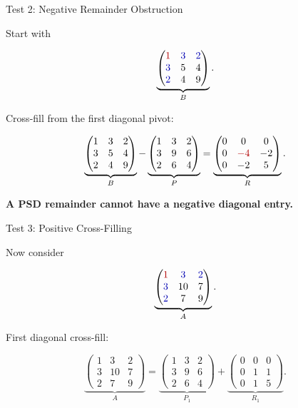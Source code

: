 \documentclass[10pt]{beamer}
\theoremstyle{definition}
\newcommand{\x}[1]{\alert{\textbf{#1}}}
\newcommand{\rd}[1]{{\color{red!70!black}#1}}
\newcommand{\bl}[1]{{\color{blue!70!black}#1}}
\begin{document}
\begin{frame}{Test 2: Negative Remainder Obstruction}

Start with

\[
\underbrace{
\begin{pmatrix}
\rd{1}&\bl{3}&\bl{2}\\
\bl{3}&5&4\\
\bl{2}&4&9
\end{pmatrix}}_{B}.
\]

\vfill

Cross-fill from the first diagonal pivot:

\[
\underbrace{
\begin{pmatrix}
1&3&2\\
3&5&4\\
2&4&9
\end{pmatrix}}_{B}
-
\underbrace{
\begin{pmatrix}
1&3&2\\
3&9&6\\
2&6&4
\end{pmatrix}}_{P}
=
\underbrace{
\begin{pmatrix}
0&0&0\\
0&\rd{-4}&-2\\
0&-2&5
\end{pmatrix}}_{R}.
\]

\vfill

\begin{center}
\x{A PSD remainder cannot have a negative diagonal entry.}
\end{center}

\end{frame}


\begin{frame}{Test 3: Positive Cross-Filling}

Now consider

\[
\underbrace{
\begin{pmatrix}
\rd{1}&\bl{3}&\bl{2}\\
\bl{3}&10&7\\
\bl{2}&7&9
\end{pmatrix}}_{A}.
\]

\vfill

First diagonal cross-fill:

\[
\underbrace{
\begin{pmatrix}
1&3&2\\
3&10&7\\
2&7&9
\end{pmatrix}}_{A}
=
\underbrace{
\begin{pmatrix}
1&3&2\\
3&9&6\\
2&6&4
\end{pmatrix}}_{P_1}
+
\underbrace{
\begin{pmatrix}
0&0&0\\
0&1&1\\
0&1&5
\end{pmatrix}}_{R_1}.
\]

\end{frame}
\end{document}
